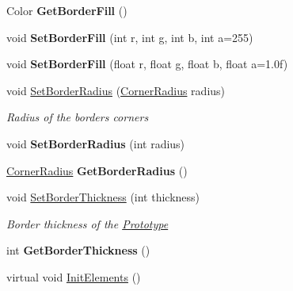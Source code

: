 \begin{DoxyCompactItemize}
\mbox{\label{class_space_v_i_l_1_1_prototype_a7a730812682029b2a5c240e7137c5750}} 
Color {\bfseries Get\+Border\+Fill} ()
\item 
\mbox{\label{class_space_v_i_l_1_1_prototype_a00d29da19398d61310ab4dd9b927e411}} 
void {\bfseries Set\+Border\+Fill} (int r, int g, int b, int a=255)
\item 
\mbox{\label{class_space_v_i_l_1_1_prototype_a88d87e1f140b89420ed2cdc47863fc0e}} 
void {\bfseries Set\+Border\+Fill} (float r, float g, float b, float a=1.\+0f)
\item 
void \mbox{\hyperlink{class_space_v_i_l_1_1_prototype_a8d472c2323f8c6bbdb39fb238bb6cff4}{Set\+Border\+Radius}} (\mbox{\hyperlink{class_space_v_i_l_1_1_decorations_1_1_corner_radius}{Corner\+Radius}} radius)
\begin{DoxyCompactList}\small\item\em Radius of the border\textquotesingle{}s corners \end{DoxyCompactList}\item 
\mbox{\label{class_space_v_i_l_1_1_prototype_a716d67b9dca43665a57bd649fea69820}} 
void {\bfseries Set\+Border\+Radius} (int radius)
\item 
\mbox{\label{class_space_v_i_l_1_1_prototype_a92e4a1777c159ff5e80f228c3bad181b}} 
\mbox{\hyperlink{class_space_v_i_l_1_1_decorations_1_1_corner_radius}{Corner\+Radius}} {\bfseries Get\+Border\+Radius} ()
\item 
void \mbox{\hyperlink{class_space_v_i_l_1_1_prototype_a3409ace379b42bc27dc088ea3b5d2c16}{Set\+Border\+Thickness}} (int thickness)
\begin{DoxyCompactList}\small\item\em Border thickness of the \mbox{\hyperlink{class_space_v_i_l_1_1_prototype}{Prototype}} \end{DoxyCompactList}\item 
\mbox{\label{class_space_v_i_l_1_1_prototype_a60b8f834323155b30fa65cc6cadc7919}} 
int {\bfseries Get\+Border\+Thickness} ()
\item 
virtual void \mbox{\hyperlink{class_space_v_i_l_1_1_prototype_ac3379fe02923ee155b5b0084abf27420}{Init\+Elements}} ()

\end{DoxyCompactItemize}
